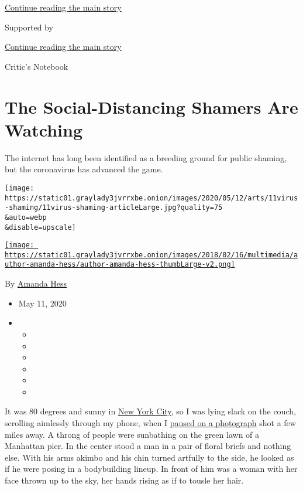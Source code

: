 \protect\hyperlink{after-top}{Continue reading the main story}

Supported by

\protect\hyperlink{after-sponsor}{Continue reading the main story}

Critic's Notebook

\hypertarget{the-social-distancing-shamers-are-watching}{%
\section{The Social-Distancing Shamers Are
Watching}\label{the-social-distancing-shamers-are-watching}}

The internet has long been identified as a breeding ground for public
shaming, but the coronavirus has advanced the game.

\texttt{[image: https://static01.graylady3jvrrxbe.onion/images/2020/05/12/arts/11virus-shaming/11virus-shaming-articleLarge.jpg?quality=75\\\&auto=webp\\\&disable=upscale]}

\href{https://www.nytimes3xbfgragh.onion/by/amanda-hess}{\texttt{[image: https://static01.graylady3jvrrxbe.onion/images/2018/02/16/multimedia/author-amanda-hess/author-amanda-hess-thumbLarge-v2.png]}}

By \href{https://www.nytimes3xbfgragh.onion/by/amanda-hess}{Amanda Hess}

\begin{itemize}
\item
  May 11, 2020
\item
  \begin{itemize}
  \item
  \item
  \item
  \item
  \item
  \item
  \end{itemize}
\end{itemize}

It was 80 degrees and sunny in
\href{https://www.nytimes3xbfgragh.onion/2020/06/18/nyregion/coronavirus-ny-social-distancing.html}{New
York City}, so I was lying slack on the couch, scrolling aimlessly
through my phone, when I
\href{https://twitter.com/LachCartwright/status/1257049652559577096}{paused
on a photograph} shot a few miles away. A throng of people were
sunbathing on the green lawn of a Manhattan pier. In the center stood a
man in a pair of floral briefs and nothing else. With his arms akimbo
and his chin turned artfully to the side, he looked as if he were posing
in a bodybuilding lineup. In front of him was a woman with her face
thrown up to the sky, her hands rising as if to tousle her hair.

